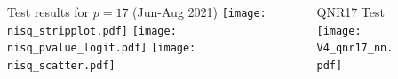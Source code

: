 \documentclass[final]{beamer}
\newlength{\sepwidth}
\newlength{\colwidth}
\newlength{\circwidth}
\newcommand{\separatorcolumn}{\begin{column}{\sepwidth}\end{column}}
\begin{document}
\begin{frame}[t]
\begin{columns}[t]
\begin{column}{\colwidth}
\end{column}
\separatorcolumn

\begin{column}{\colwidth}
  \begin{block}{Test results for $p=17$ \hspace{1ex}  (Jun-Aug 2021)}
    \texttt{[image: nisq\_stripplot.pdf]}
    \texttt{[image: nisq\_pvalue\_logit.pdf]}
    \texttt{[image: nisq\_scatter.pdf]}

  \end{block}


\end{column}

\separatorcolumn

\begin{column}{\circwidth}
  \begin{block}{QNR17 Test}
    \texttt{[image: V4\_qnr17\_nn.pdf]}
  \end{block}

\end{column}

\separatorcolumn
\end{columns}
\end{frame}
\end{document}
